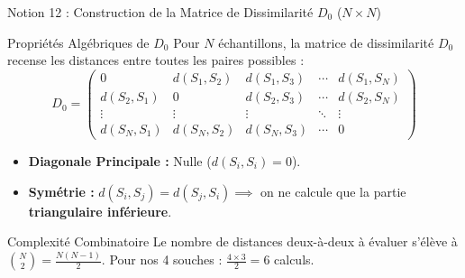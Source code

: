 \documentclass[aspectratio=169,10pt]{beamer}
\begin{document}
\begin{frame}{Notion 12 : Construction de la Matrice de Dissimilarité $D_0$ ($N \times N$)}
  \begin{conceptbox}{Propriétés Algébriques de $D_0$}
    \footnotesize
    Pour $N$ échantillons, la matrice de dissimilarité $D_0$ recense les distances entre toutes les paires possibles :
    \begin{equation*}
      D_0 = \begin{pmatrix} 0 & d(S_1, S_2) & d(S_1, S_3) & \cdots & d(S_1, S_N) \\ d(S_2, S_1) & 0 & d(S_2, S_3) & \cdots & d(S_2, S_N) \\ \vdots & \vdots & \vdots & \ddots & \vdots \\ d(S_N, S_1) & d(S_N, S_2) & d(S_N, S_3) & \cdots & 0 \end{pmatrix}
    \end{equation*}
    \begin{itemize}
      \item \textbf{Diagonale Principale :} Nulle ($d(S_i, S_i) = 0$).
      \item \textbf{Symétrie :} $d(S_i, S_j) = d(S_j, S_i) \implies$ on ne calcule que la partie \textbf{triangulaire inférieure}.
    \end{itemize}
  \end{conceptbox}
  \vspace{1mm}
  \begin{takeawaybox}{Complexité Combinatoire}
    \footnotesize
    Le nombre de distances deux-à-deux à évaluer s'élève à $\binom{N}{2} = \frac{N(N-1)}{2}$. Pour nos 4 souches : $\frac{4 \times 3}{2} = 6$ calculs.
  \end{takeawaybox}
\end{frame}
\end{document}
